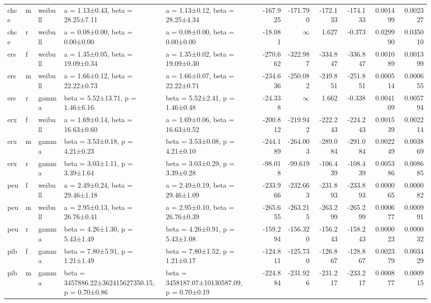 \begin{tabular}{lllllrrrrrr}
chce & m & weibull & a = 1.13±0.43, beta = 28.25±7.11 & a = 1.13±0.12, beta = 28.25±4.34 & -167.925 & -171.790 & -172.133 & -174.133 & 0.001499 & 0.002327 \\
chce & r & weibull & a = 0.08±0.00, beta = 0.00±0.00 & a = 0.08±0.00, beta = 0.00±0.00 & -18.081 & $\infty$ & 1.627 & -0.373 & 0.029990 & 0.035010 \\
ers & f & weibull & a = 1.35±0.05, beta = 19.09±0.34 & a = 1.35±0.02, beta = 19.09±0.30 & -270.662 & -322.987 & -334.847 & -336.847 & 0.001089 & 0.001399 \\
ers & m & weibull & a = 1.66±0.12, beta = 22.22±0.73 & a = 1.66±0.07, beta = 22.22±0.71 & -234.636 & -250.082 & -249.851 & -251.851 & 0.000514 & 0.000655 \\
ers & r & gamma & beta = 5.52±13.71, p = 1.46±6.16 & beta = 5.52±2.41, p = 1.46±0.48 & -24.338 & $\infty$ & 1.662 & -0.338 & 0.004109 & 0.005794 \\
erx & f & weibull & a = 1.69±0.14, beta = 16.63±0.60 & a = 1.69±0.06, beta = 16.63±0.52 & -200.812 & -219.942 & -222.243 & -224.243 & 0.001539 & 0.002214 \\
erx & m & gamma & beta = 3.53±0.18, p = 4.21±0.23 & beta = 3.53±0.08, p = 4.21±0.10 & -244.189 & -264.003 & -289.084 & -291.084 & 0.002249 & 0.003869 \\
erx & r & gamma & beta = 3.03±1.11, p = 3.39±1.64 & beta = 3.03±0.29, p = 3.39±0.28 & -98.018 & -99.619 & -106.439 & -108.439 & 0.005386 & 0.008685 \\
peu & f & weibull & a = 2.49±0.24, beta = 29.46±1.18 & a = 2.49±0.19, beta = 29.46±1.09 & -233.966 & -232.663 & -231.893 & -233.893 & 0.000065 & 0.000082 \\
peu & m & weibull & a = 2.95±0.13, beta = 26.76±0.41 & a = 2.95±0.10, beta = 26.76±0.39 & -265.655 & -263.215 & -263.299 & -265.299 & 0.000677 & 0.000991 \\
peu & r & gamma & beta = 4.26±1.30, p = 5.43±1.49 & beta = 4.26±0.91, p = 5.43±1.08 & -159.294 & -156.320 & -156.243 & -158.243 & 0.000023 & 0.000032 \\
pib & f & gamma & beta = 7.80±5.91, p = 1.21±1.49 & beta = 7.80±1.52, p = 1.21±0.17 & -124.811 & -125.730 & -126.867 & -128.867 & 0.002379 & 0.003429 \\
pib & m & gamma & \shortstack[l]{beta = 3457886.22±362415627350.15,\\ p = 0.70±0.86} & \shortstack[l]{beta = 3458187.07±10130587.09,\\ p = 0.70±0.19} & -224.884 & -231.926 & -231.217 & -233.217 & 0.000877 & 0.000915 \\

\end{tabular}
